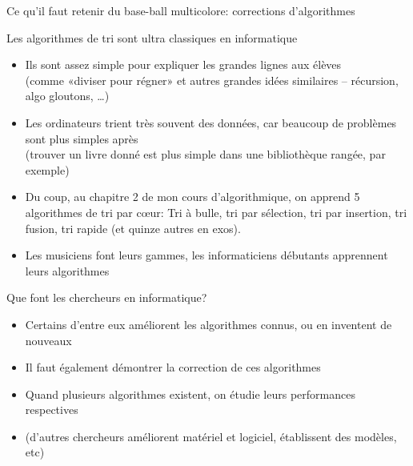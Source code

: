 \documentclass[final,hyperref={pdfpagelabels=false}]{beamer}
\begin{document}
\begin{frame}{Ce qu'il faut retenir du base-ball multicolore: corrections d'algorithmes}
  \begin{block}{Les algorithmes de tri sont ultra classiques en informatique}
    \begin{itemize}
    \item Ils sont assez simple pour expliquer les grandes lignes aux élèves\\
      (comme «diviser pour régner» et autres grandes idées similaires --
      récursion, algo gloutons, \ldots)
    \item Les ordinateurs trient très souvent des données, car
      beaucoup de problèmes sont plus simples après\\
      (trouver un livre donné est plus simple dans une bibliothèque rangée, par exemple)
    \item Du coup, au chapitre 2 de mon cours d'algorithmique, on apprend 5
      algorithmes de tri par cœur: Tri à bulle, tri par sélection, tri par
      insertion, tri fusion, tri rapide (et quinze autres en exos).
    \item \alert{Les musiciens font leurs gammes, les informaticiens débutants
      apprennent leurs algorithmes}
    \end{itemize}
  \end{block}

  \begin{block}{Que font les chercheurs en informatique?}
    \begin{itemize}
    \item Certains d'entre eux améliorent les algorithmes connus, ou en
      inventent de nouveaux
    \item Il faut également démontrer la correction de ces algorithmes
    \item Quand plusieurs algorithmes existent, on étudie leurs \alert{performances} respectives
    \item (d'autres chercheurs améliorent matériel et logiciel, établissent des
      modèles, etc)
    \end{itemize}
  \end{block}
\end{frame}
\end{document}
